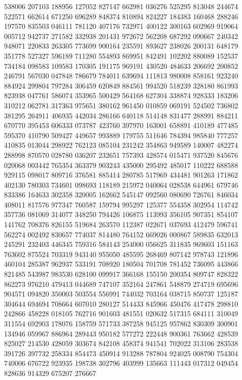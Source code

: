 {538006 207103 188956 127052 827147 662981 036276 525295 813048 244674 522571%
662614 671250 696289 848374 810894 824227 184383 160468 288246 197570 835503%
046111 781120 407176 732971 400122 300163 602969 919064 005712 942737 271582%
332938 201431 972672 562208 687292 090667 240342 948071 220833 263305 773699%
900164 235591 893627 238026 200131 648179 351778 527327 596189 711280 554893%
869951 842491 102202 880089 152537 734184 098583 109583 170305 191175 969191%
430520 484633 206692 200852 246791 567030 047848 786679 784011 639694 111813%
980008 858161 923240 884924 299804 797284 306459 620849 884561 994520 518239%
328180 861993 823938 047761 586074 353965 500429 564168 627304 338874 928333%
183206 310212 062781 317363 975651 380162 961450 010859 069191 524502 736802%
381295 264911 406935 442034 286166 640118 514148 831477 288991 884211 670770%
395453 606333 073787 423760 397970 163001 658891 410189 477485 595370 410790%
509427 449657 993889 179755 511646 784394 985840 777257 410835 013044 298922%
762123 085104 231242 354863 949589 140007 482274 288998 870570 028780 036207%
232651 757393 428574 015471 937520 845676 020068 003442 765354 363379 903243%
435000 295492 485017 110222 688588 929115 098017 809716 376581 885414 280785%
517969 434481 901263 171862 402130 780303 734601 098693 118189 215972 040064%
028538 644961 679746 833386 164633 302358 320005 162662 545147 092560 080690%
726761 846034 408011 817576 977347 760587 159794 995297 125377 554358 302954%
114742 357736 081069 314077 348250 794426 106875 113993 356105 907351 854107%
141762 708376 826155 519684 263570 112387 022671 037693 412479 596741 562274%
002492 830657 774037 814480 764152 669026 000867 589835 632013 245291 232403%
446345 759316 584143 254000 056625 311835 969603 151163 763602 875524 703319%
943140 955050 485595 268469 807142 978743 121896 460104 285387 962937 533191%
708920 180504 701708 781452 736095 443866 821485 543987 983530 628100 099917%
366168 155150 200354 809747 828322 862273 976210 479413 044689 747107 352164%
247861 548879 274719 695696 904571 094820 350003 503554 556991 744032 703164%
038715 850737 125187 304644 694694 708664 607010 280127 514433 845966 450476%
417478 298810 242866 458228 018105 762716 901603 481551 020632 517315 684111%
310049 311554 692903 178076 158759 571733 387258 945125 957862 830309 300901%
134946 059967 886964 289443 950182 577272 222448 900361 763662 428539 825027%
214530 428059 303674 842108 458374 941541 702022 313106 283538 391726 397732%
258334 854473 450914 913288 787804 924025 008790 754304 740006 676722 923935%
198738 302796 403999 135663 111443 017312 049454 828636 914329 675207 276667%
}
